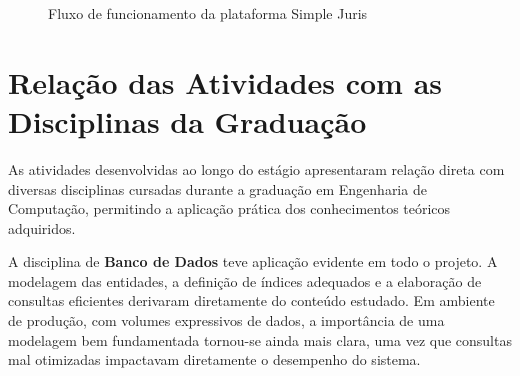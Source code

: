 \documentclass[
	12pt,
	oneside,
	a4paper,
	brazil,
	sumario=tradicional
]{abntex2}
\begin{document}
\begin{figure}[htb]
	\caption{\label{fig:fluxo}Fluxo de funcionamento da plataforma Simple Juris}
	\begin{center}
	\end{center}
\end{figure}

\section{Relação das Atividades com as Disciplinas da Graduação}

As atividades desenvolvidas ao longo do estágio apresentaram relação direta com diversas disciplinas cursadas durante a graduação em Engenharia de Computação, permitindo a aplicação prática dos conhecimentos teóricos adquiridos.

A disciplina de \textbf{Banco de Dados} teve aplicação evidente em todo o projeto. A modelagem das entidades, a definição de índices adequados e a elaboração de consultas eficientes derivaram diretamente do conteúdo estudado. Em ambiente de produção, com volumes expressivos de dados, a importância de uma modelagem bem fundamentada tornou-se ainda mais clara, uma vez que consultas mal otimizadas impactavam diretamente o desempenho do sistema.
\end{document}
